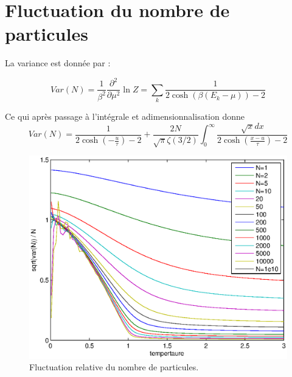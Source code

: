 \documentclass[a4paper,english]{article}
\begin{document}
\section{Fluctuation du nombre de particules}

La variance est donnée par :

$$Var(N) = \frac{1}{\beta^2} \frac{\partial^2}{\partial \mu^2} \ln Z = \sum_k \frac{1}{2 \cosh(\beta(E_k-\mu))-2}$$

Ce qui après passage à l'intégrale et adimensionnalisation donne 
$$Var(N) = \frac{1}{2\cosh(-\frac{u}{\tau})-2} + \frac{2N}{\sqrt{\pi} \zeta(3/2)} \int_0^\infty \frac{\sqrt{x} dx}{2\cosh(\frac{x-u}{\tau})-2}$$

\begin{figure}
	\centering
	\includegraphics{rel.eps}
	\caption{Fluctuation relative du nombre de particules.}
\end{figure}
\end{document}
